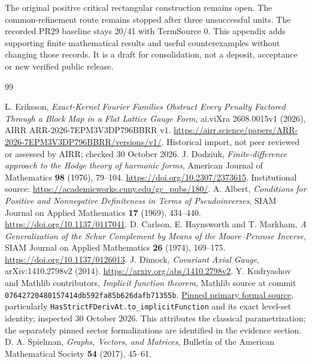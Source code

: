 \documentclass[11pt]{article}
\begin{document}
The original positive critical rectangular construction remains open.
The common-refinement route remains stopped after three unsuccessful units.
The recorded PR29 baseline stays 20/41 with TermSource 0. This appendix adds
supporting finite mathematical results and useful counterexamples without
changing those records. It is a draft for consolidation, not a deposit,
acceptance or new verified public release.





\begin{thebibliography}{99}
\small
\raggedright
{} L. Eriksson, \emph{Exact-Kernel Fourier Families Obstruct
Every Penalty Factored Through a Block Map in a Flat Lattice Gauge Form},
ai.viXra 2608.0015v1 (2026), AIRR ARR-2026-7EPM3V3DP796BBRR v1.
\url{https://airr.science/papers/ARR-2026-7EPM3V3DP796BBRR/versions/v1/}.
Historical import, not peer reviewed or assessed by AIRR; checked 30 October 2026.
 J. Dodziuk, \emph{Finite-difference approach to the Hodge
theory of harmonic forms}, American Journal of Mathematics \textbf{98}
(1976), 79--104. \url{https://doi.org/10.2307/2373615}.
Institutional source: \url{https://academicworks.cuny.edu/gc_pubs/180/}.
 A. Albert, \emph{Conditions for Positive and Nonnegative
Definiteness in Terms of Pseudoinverses}, SIAM Journal on Applied Mathematics
\textbf{17} (1969), 434--440. \url{https://doi.org/10.1137/0117041}.
 D. Carlson, E. Haynsworth and T. Markham,
\emph{A Generalization of the Schur Complement by Means of the Moore--Penrose
Inverse}, SIAM Journal on Applied Mathematics \textbf{26} (1974), 169--175.
\url{https://doi.org/10.1137/0126013}.
 J. Dimock, \emph{Covariant Axial Gauge},
arXiv:1410.2798v2 (2014). \url{https://arxiv.org/abs/1410.2798v2}.
 Y. Kudryashov and Mathlib contributors,
\emph{Implicit function theorem}, Mathlib source at commit
\texttt{07642720480157414db592fa85b626dafb71355b}.
\href{https://github.com/leanprover-community/mathlib4/blob/07642720480157414db592fa85b626dafb71355b/Mathlib/Analysis/Calculus/Implicit.lean}{Pinned primary formal source},
particularly \texttt{HasStrictFDerivAt.to\_implicitFunction} and its exact
level-set identity; inspected 30 October 2026. This attributes the classical parametrization; the separately pinned sector formalizations are identified in the evidence section.
 D. A. Spielman, \emph{Graphs, Vectors, and Matrices},
Bulletin of the American Mathematical Society \textbf{54} (2017), 45--61.

\end{thebibliography}
\end{document}

